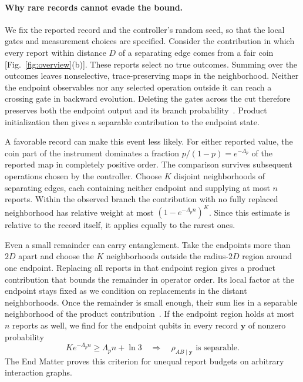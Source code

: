 \documentclass[aps,prl,twocolumn,superscriptaddress,longbibliography,reprint,floatfix]{revtex4-2}
\begin{document}
\paragraph*{Why rare records cannot evade the bound.}
We fix the reported record and the controller's random seed, so that the local gates and measurement choices are specified. Consider the contribution in which every report within distance $D$ of a separating edge comes from a fair coin [Fig.~\ref{fig:overview}(b)]. These reports select no true outcomes. Summing over the outcomes leaves nonselective, trace-preserving maps in the neighborhood. Neither the endpoint observables nor any selected operation outside it can reach a crossing gate in backward evolution. Deleting the gates across the cut therefore preserves both the endpoint output and its branch probability~\cite{Friedman2023}. Product initialization then gives a separable contribution to the endpoint state.

A favorable record can make this event less likely. For either reported value, the coin part of the instrument dominates a fraction $p/(1-p)=e^{-\Lambda_p}$ of the reported map in completely positive order. The comparison survives subsequent operations chosen by the controller. Choose $K$ disjoint neighborhoods of separating edges, each containing neither endpoint and supplying at most $n$ reports. Within the observed branch the contribution with no fully replaced neighborhood has relative weight at most $(1-e^{-\Lambda_pn})^K$. Since this estimate is relative to the record itself, it applies equally to the rarest ones.

Even a small remainder can carry entanglement. Take the endpoints more than $2D$ apart and choose the $K$ neighborhoods outside the radius-$2D$ region around one endpoint. Replacing all reports in that endpoint region gives a product contribution that bounds the remainder in operator order. Its local factor at the endpoint stays fixed as we condition on replacements in the distant neighborhoods. Once the remainder is small enough, their sum lies in a separable neighborhood of the product contribution~\cite{Gurvits2002,Hanson2020}. If the endpoint region holds at most $n$ reports as well, we find for the endpoint qubits in every record $\boldsymbol y$ of nonzero probability
\begin{equation}
 Ke^{-\Lambda_pn}\ge\Lambda_pn+\ln3
 \quad\Longrightarrow\quad
 \rho_{AB\mid\boldsymbol y}\text{ is separable}.
 \label{eq:criterion-main}
\end{equation}
The End Matter proves this criterion for unequal report budgets on arbitrary interaction graphs.
\end{document}
